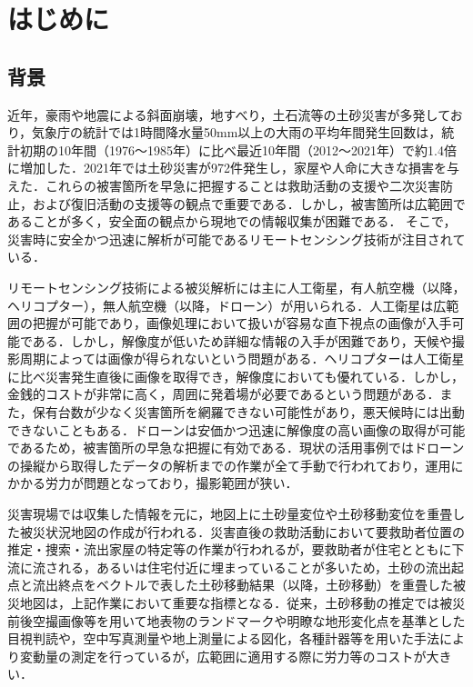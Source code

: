 \chapter{はじめに}
  \section{背景}
    近年，豪雨や地震による斜面崩壊，地すべり，土石流等の土砂災害が多発しており，気象庁の統計では1時間降水量50mm以上の大雨の平均年間発生回数は，統計初期の10年間（1976〜1985年）に比べ最近10年間（2012〜2021年）で約1.4倍に増加した\cite{背景1}．2021年では土砂災害が972件発生し，家屋や人命に大きな損害を与えた\cite{背景2}．これらの被害箇所を早急に把握することは救助活動の支援や二次災害防止，および復旧活動の支援等の観点で重要である\cite{}．しかし，被害箇所は広範囲であることが多く，安全面の観点から現地での情報収集が困難である．
    そこで，災害時に安全かつ迅速に解析が可能であるリモートセンシング技術が注目されている\cite{}．

    リモートセンシング技術による被災解析には主に人工衛星，有人航空機（以降，ヘリコプター），無人航空機（以降，ドローン）が用いられる．人工衛星は広範囲の把握が可能であり，画像処理において扱いが容易な直下視点の画像が入手可能である．しかし，解像度が低いため詳細な情報の入手が困難であり，天候や撮影周期によっては画像が得られないという問題がある．ヘリコプターは人工衛星に比べ災害発生直後に画像を取得でき，解像度においても優れている．しかし，金銭的コストが非常に高く，周囲に発着場が必要であるという問題がある．また，保有台数が少なく災害箇所を網羅できない可能性があり，悪天候時には出動できないこともある．ドローンは安価かつ迅速に解像度の高い画像の取得が可能であるため，被害箇所の早急な把握に有効である．現状の活用事例ではドローンの操縦から取得したデータの解析までの作業が全て手動で行われており，運用にかかる労力が問題となっており，撮影範囲が狭い．

    災害現場では収集した情報を元に，地図上に土砂量変位や土砂移動変位を重畳した被災状況地図の作成が行われる．災害直後の救助活動において要救助者位置の推定・捜索・流出家屋の特定等の作業が行われるが，要救助者が住宅とともに下流に流される，あるいは住宅付近に埋まっていることが多いため，土砂の流出起点と流出終点をベクトルで表した土砂移動結果（以降，土砂移動）を重畳した被災地図は，上記作業において重要な指標となる．従来，土砂移動の推定では被災前後空撮画像等を用いて地表物のランドマークや明瞭な地形変化点を基準とした目視判読や，空中写真測量や地上測量による図化，各種計器等を用いた手法により変動量の測定を行っているが\cite{}，広範囲に適用する際に労力等のコストが大きい．

